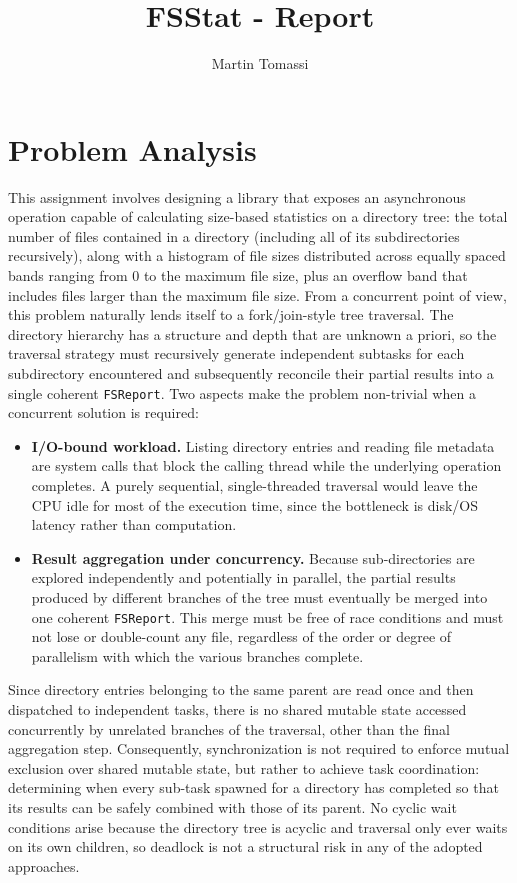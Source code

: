 \documentclass[11pt,a4paper]{article}
\title{\textbf{FSStat - Report}}
\author{Martin Tomassi}
\date{}
\begin{document}
\maketitle

\section{Problem Analysis}

This assignment involves designing a library that exposes an asynchronous operation capable of calculating size-based statistics on a directory tree: the total number of files contained in a directory (including all of its subdirectories recursively), along with a histogram of file sizes distributed across equally spaced bands ranging from 0 to the maximum file size, plus an overflow band that includes files larger than the maximum file size. From a concurrent point of view, this problem naturally lends itself to a fork/join-style tree traversal. The directory hierarchy has a structure and depth that are unknown a priori, so the traversal strategy must recursively generate independent subtasks for each subdirectory encountered and subsequently reconcile their partial results into a single coherent \texttt{FSReport}. Two aspects make the problem non-trivial when a concurrent solution is required:

\begin{itemize}
	\item \textbf{I/O-bound workload.} Listing directory entries and reading file metadata are system calls that block the calling thread while the underlying operation completes. A purely sequential, single-threaded traversal would leave the CPU idle for most of the execution time, since the bottleneck is disk/OS latency rather than computation.
	\item \textbf{Result aggregation under concurrency.} Because sub-directories are explored independently and potentially in parallel, the partial results produced by different branches of the tree must eventually be merged into one coherent \texttt{FSReport}. This merge must be free of race conditions and must not lose or double-count any file, regardless of the order or degree of parallelism with which the various branches complete.
\end{itemize}

Since directory entries belonging to the same parent are read once and then dispatched to independent tasks, there is no shared mutable state accessed concurrently by unrelated branches of the traversal, other than the final aggregation step. Consequently, synchronization is not required to enforce mutual exclusion over shared mutable state, but rather to achieve task coordination: determining when every sub-task spawned for a directory has completed so that its results can be safely combined with those of its parent. No cyclic wait conditions arise because the directory tree is acyclic and traversal only ever waits on its own children, so deadlock is not a structural risk in any of the adopted approaches.
\end{document}
